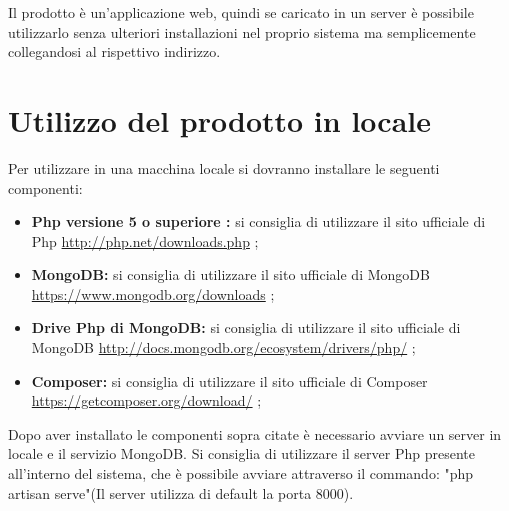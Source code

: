 Il prodotto \PROGETTO{} è un'applicazione web, quindi se caricato in un server è possibile utilizzarlo senza ulteriori installazioni nel proprio sistema ma semplicemente collegandosi al rispettivo indirizzo.

\section{Utilizzo del prodotto in locale}
Per utilizzare \PROGETTO{} in una macchina locale si dovranno installare le seguenti componenti:
\begin{itemize}
	\item \textbf{Php versione 5 o superiore :} si consiglia di utilizzare il sito ufficiale di Php \url{http://php.net/downloads.php} ;
	\item \textbf{MongoDB: } si consiglia di utilizzare il sito ufficiale di MongoDB \url{https://www.mongodb.org/downloads} ;
	\item \textbf{Drive Php di MongoDB: } si consiglia di utilizzare il sito ufficiale di MongoDB \url{http://docs.mongodb.org/ecosystem/drivers/php/} ;  
	\item \textbf{Composer: } si consiglia di utilizzare il sito ufficiale di Composer \url{https://getcomposer.org/download/} ;
\end{itemize}
Dopo aver installato le componenti sopra citate è necessario avviare un server in locale e il servizio MongoDB. Si consiglia di utilizzare il server Php presente all'interno del sistema, che è possibile avviare attraverso il commando: "php artisan serve"(Il server utilizza di default la porta 8000).